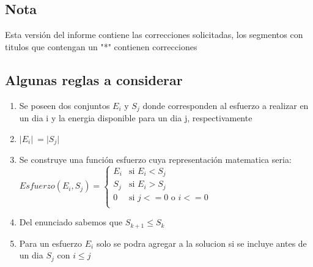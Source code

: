 \subsection{Nota }

        Esta versión del informe contiene las correcciones solicitadas, los segmentos con titulos que contengan un "*" contienen correcciones 
        
\subsection{Algunas reglas a considerar}

\begin{enumerate}
    \item Se poseen dos conjuntos $E_i \text{ y } S_j$ donde corresponden al esfuerzo a realizar en un dia i y la energia disponible para un dia j, respectivamente
\item $\lvert E_i \lvert \ = \lvert S_j \lvert$ 
\item Se construye una función esfuerzo cuya representación matematica seria:
$
Esfuerzo(E_i, S_j) = \begin{cases}
  E_i & \text{si }  E_i < S_j\\
  S_j & \text{si }  E_i > S_j\\
  0 & \text{si }  j <= 0 \text{ o }  i <=0 \\
\end{cases}
$
\item Del enunciado sabemos que $S_{k+1} \le S_k$
\item Para un esfuerzo $E_i$ solo se podra agregar a la solucion si se incluye antes de un dia $S_j$ con $i \leq j$ 
\end{enumerate}